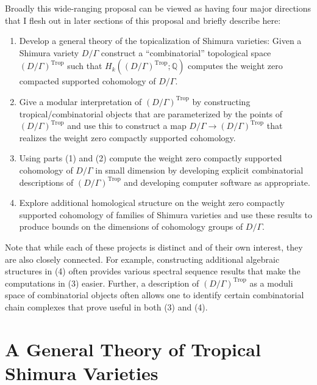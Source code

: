 \documentclass[11pt,reqno]{amsart}
\theoremstyle{remark}
\newcommand{\QQ}{\mathbb{Q}}
\DeclareMathOperator{\Trop}{Trop}
\begin{document}
Broadly this wide-ranging proposal can be viewed as having four major directions that I flesh out in later sections of this proposal and briefly describe here:
\begin{enumerate}
\item Develop a general theory of the topicalization of Shimura varieties: Given a Shimura variety $D/\Gamma$ construct a ``combinatorial'' topological space $(D/\Gamma)^{\Trop}$ such that $H_{k}((D/\Gamma)^{\Trop}; \QQ)$ computes the weight zero compacted supported cohomology of $D/\Gamma$.
\item Give a modular interpretation of $(D/\Gamma)^{\Trop}$ by constructing tropical/combinatorial objects that are parameterized by the points of $(D/\Gamma)^{\Trop}$ and use this to construct a map $D/\Gamma\to (D/\Gamma)^{\Trop}$ that realizes the weight zero compactly supported cohomology.
\item Using parts (1) and (2) compute the weight zero compactly supported cohomology of $D/\Gamma$ in small dimension by developing explicit combinatorial descriptions of $(D/\Gamma)^{\Trop}$ and developing computer software as appropriate.
\item Explore additional homological structure on the weight zero compactly supported cohomology of families of Shimura varieties and use these results to produce bounds on the dimensions of cohomology groups of $D/\Gamma$.
\end{enumerate}

Note that while each of these projects is distinct and of their own interest, they are also closely connected. For example, constructing additional algebraic structures in (4) often provides various spectral sequence results that make the computations in (3) easier. Further, a description of $(D/\Gamma)^{\Trop}$ as a moduli space of combinatorial objects often allows one to identify certain combinatorial chain complexes that prove useful in both (3) and (4).  


\section{A General Theory of Tropical Shimura Varieties}\label{sec:gen-trop}
\end{document}

